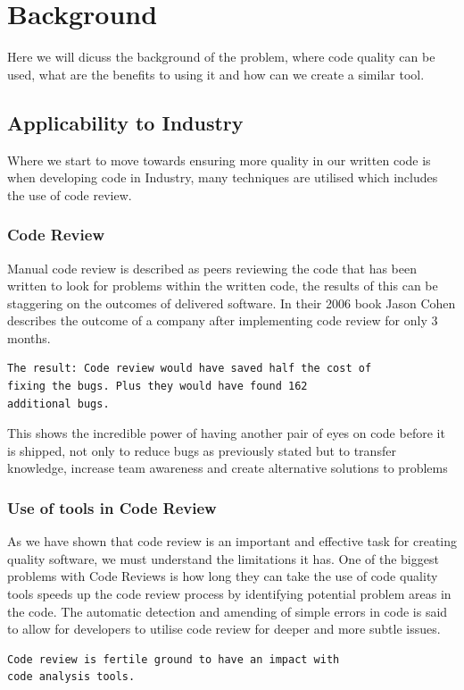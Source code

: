 \section{Background}
Here we will dicuss the background of the problem, where code quality can be used, what are the benefits to using it and how 
can we create a similar tool.
\subsection{Applicability to Industry}
Where we start to move towards ensuring more quality in our written code is when developing code in Industry,
many techniques are utilised which includes the use of code review.
\subsubsection{Code Review}
Manual code review is described as peers reviewing the code that has been written to look for problems within the written code,
the results of this can be staggering on the outcomes of delivered software.
In their 2006 book Jason Cohen describes the outcome of a company after implementing code review for only 3 months. \cite{cohen2006best}
\begin{verbatim}
The result: Code review would have saved half the cost of
fixing the bugs. Plus they would have found 162 
additional bugs.
\end{verbatim}
This shows the incredible power of having another pair of eyes on code before it is shipped,
not only to reduce bugs as previously stated but to transfer knowledge, increase team awareness and create alternative solutions to problems \cite{modernCodeReview}


\subsubsection{Use of tools in Code Review}
As we have shown that code review is an important and effective task for creating quality software, we must understand the limitations it has.
One of the biggest problems with Code Reviews is how long they can take
the use of code quality tools speeds up the code review process by identifying potential problem areas in the code. \cite{confusionInCodeReviews}
\newline
The automatic detection and amending of simple errors in code is said to allow for developers to utilise code review for deeper and more subtle issues. \cite{modernCodeReview}
\begin{verbatim}
Code review is fertile ground to have an impact with 
code analysis tools.
\end{verbatim}\cite{modernCodeReview}




